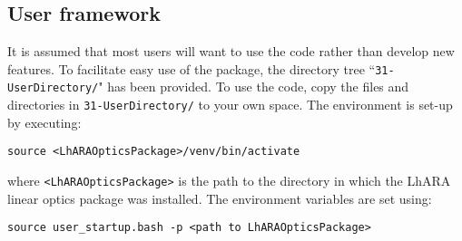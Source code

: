\subsection{User framework}
\label{A2:UsrFrmwrk}
It is assumed that most users will want to use the code rather than
develop new features.
To facilitate easy use of the package, the directory tree
``\verb+31-UserDirectory/+" has been provided.
To use the code, copy the files and directories in
\verb+31-UserDirectory/+ to your own space.
The environment is set-up by executing:
\begin{center}
  \verb+source <LhARAOpticsPackage>/venv/bin/activate+
\end{center}
where \verb+<LhARAOpticsPackage>+ is the path to the directory in
which the LhARA linear optics package was installed.
The environment variables are set using:
\begin{center}
  \verb+source user_startup.bash -p <path to LhARAOpticsPackage>+
\end{center}

